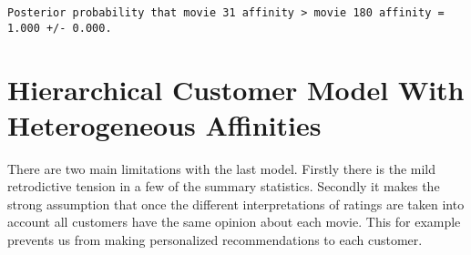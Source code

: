 \documentclass[
  letterpaper,
  DIV=11,
  numbers=noendperiod]{scrartcl}
\newenvironment{Shaded}{\begin{snugshade}}{\end{snugshade}}
\newcommand{\ControlFlowTok}[1]{\textcolor[rgb]{0.00,0.23,0.31}{#1}}
\newcommand{\DecValTok}[1]{\textcolor[rgb]{0.68,0.00,0.00}{#1}}
\newcommand{\FunctionTok}[1]{\textcolor[rgb]{0.28,0.35,0.67}{#1}}
\newcommand{\NormalTok}[1]{\textcolor[rgb]{0.00,0.23,0.31}{#1}}
\newcommand{\OtherTok}[1]{\textcolor[rgb]{0.00,0.23,0.31}{#1}}
\newcommand{\SpecialCharTok}[1]{\textcolor[rgb]{0.37,0.37,0.37}{#1}}
\newcommand{\StringTok}[1]{\textcolor[rgb]{0.13,0.47,0.30}{#1}}
\begin{document}
\begin{Shaded}
\end{Shaded}

\begin{verbatim}
Posterior probability that movie 31 affinity > movie 180 affinity = 1.000 +/- 0.000.
\end{verbatim}

\section{Hierarchical Customer Model With Heterogeneous
Affinities}\label{hierarchical-customer-model-with-heterogeneous-affinities}

There are two main limitations with the last model. Firstly there is the
mild retrodictive tension in a few of the summary statistics. Secondly
it makes the strong assumption that once the different interpretations
of ratings are taken into account all customers have the same opinion
about each movie. This for example prevents us from making personalized
recommendations to each customer.
\end{document}
